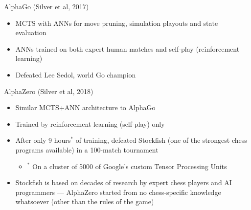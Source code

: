 \begin{frame}{AlphaGo (Silver et al, 2017)}
	\begin{itemize}
		\pause\item MCTS with ANNs for move pruning, simulation playouts and state evaluation
		\pause\item ANNs trained on both expert human matches and self-play (reinforcement learning)
		\pause\item Defeated Lee Sedol, world Go champion
	\end{itemize}
\end{frame}

\begin{frame}{AlphaZero (Silver et al, 2018)}
	\begin{itemize}
		\pause\item Similar MCTS+ANN architecture to AlphaGo
		\pause\item Trained by reinforcement learning (self-play) only
		\pause\item After only 9 hours$^*$ of training, defeated Stockfish
			(one of the strongest chess programs available) in a 100-match tournament
			\begin{itemize}
				\pause\item $^*$ On a cluster of 5000 of Google's custom Tensor Processing Units
			\end{itemize}
		\pause\item Stockfish is based on decades of research by expert chess players and AI programmers
			--- AlphaZero started from no chess-specific knowledge whatsoever (other than the rules of the game)
	\end{itemize}
\end{frame}

